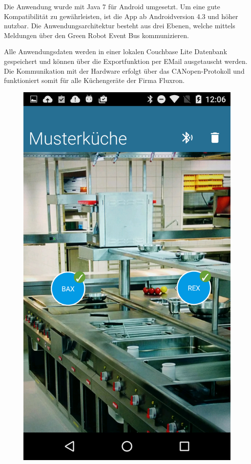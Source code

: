 Die Anwendung wurde mit Java 7 für Android umgesetzt. Um eine gute Kompatibilität zu gewährleisten, ist die App ab Androidversion 4.3 und höher nutzbar. Die Anwendungsarchitektur besteht aus drei Ebenen, welche mittels Meldungen über den Green Robot Event Bus kommunizieren.

Alle Anwendungsdaten werden in einer lokalen Couchbase Lite Datenbank gespeichert und können über die Exportfunktion per EMail ausgetauscht werden. Die Kommunikation mit der Hardware erfolgt über das CANopen-Protokoll und funktioniert somit für alle Küchengeräte der Firma Fluxron.
\WFclear
\pagebreak

\begin{figure}
	\vspace{0.5cm}
	\begin{center}
		\includegraphics[scale=0.12]{start/img/screenshot}
	\end{center}
\end{figure}

